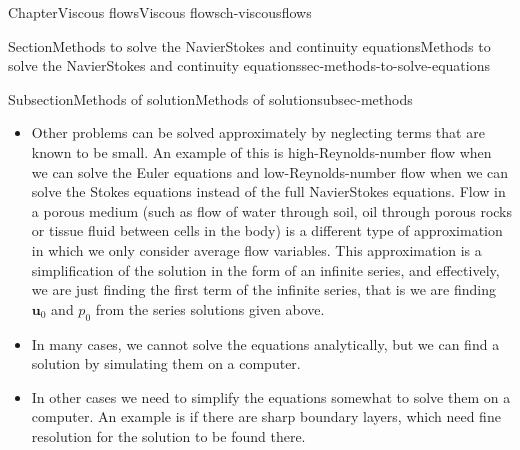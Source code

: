 \documentclass[oneside,10pt,]{book}
\newcommand{\ptxlistdisc}{\raisebox{0.3ex}{\textbullet}}
\newcommand{\ptxlistcircle}{\raisebox{0.3ex}{\textopenbullet}}
\numberwithin{equation}{section}
\newcommand{\bu}{\boldsymbol{u}}
\begin{document}
\begin{chapterptx}{Chapter}{Viscous flows}{}{Viscous flows}{}{}{ch-viscousflows}
\begin{sectionptx}{Section}{Methods to solve the Navier\textendash{}Stokes and continuity equations}{}{Methods to solve the Navier\textendash{}Stokes and continuity equations}{}{}{sec-methods-to-solve-equations}
\begin{subsectionptx}{Subsection}{Methods of solution}{}{Methods of solution}{}{}{subsec-methods}
\begin{itemize}[label=\ptxlistdisc]
\begin{align*}
p=&p_0+\epsilon p_1+\epsilon^2p_2+\epsilon^3p_3+\dots,
\end{align*}
where the dots indicate terms multiplied by higher powers of \(\epsilon\) (that is, smaller terms). Examples include:%
\begin{itemize}[label=\ptxlistcircle]
\item{}flow in a curved pipe for small Dean numbers (proportional to the Reynolds number times the square root of the curvature of the pipe),%
\item{}flow of a thin film of fluid. We take \(\epsilon\) equal to a typical film thickness divided by a typical lengthscale tangential to the film. Often, it is sufficient to compute only the leading nontrivial terms in the series, and the equations governing these terms represent a hugh simplification over the Navier\textendash{}Stokes and continuity equations. Whilst the resulting equations generally need to be solved numerically, the spatial dimension of the problem is reduced by one for such flows, and this is a huge saving of computational time.%
\end{itemize}
%
\item{}Other problems can be solved approximately by neglecting terms that are known to be small. An example of this is high-Reynolds-number flow when we can solve the Euler equations and low-Reynolds-number flow when we can solve the Stokes equations instead of the full Navier\textendash{}Stokes equations. Flow in a porous medium (such as flow of water through soil, oil through porous rocks or tissue fluid between cells in the body) is a different type of approximation in which we only consider average flow variables. This approximation is a simplification of the solution in the form of an infinite series, and effectively, we are just finding the first term of the infinite series, that is we are finding \(\bu_0\) and \(p_0\) from the series solutions given above.%
\item{}In many cases, we cannot solve the equations analytically, but we can find a solution by simulating them on a computer.%
\item{}In other cases we need to simplify the equations somewhat to solve them on a computer. An example is if there are sharp boundary layers, which need fine resolution for the solution to be found there.%

\end{itemize}
\end{subsectionptx}
\end{sectionptx}
\end{chapterptx}
\end{document}
